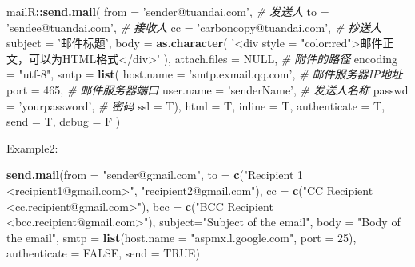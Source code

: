 \documentclass[]{book}
\newenvironment{Shaded}{\begin{snugshade}}{\end{snugshade}}
\newcommand{\KeywordTok}[1]{\textcolor[rgb]{0.13,0.29,0.53}{\textbf{#1}}}
\newcommand{\DataTypeTok}[1]{\textcolor[rgb]{0.13,0.29,0.53}{#1}}
\newcommand{\DecValTok}[1]{\textcolor[rgb]{0.00,0.00,0.81}{#1}}
\newcommand{\StringTok}[1]{\textcolor[rgb]{0.31,0.60,0.02}{#1}}
\newcommand{\CommentTok}[1]{\textcolor[rgb]{0.56,0.35,0.01}{\textit{#1}}}
\newcommand{\OtherTok}[1]{\textcolor[rgb]{0.56,0.35,0.01}{#1}}
\newcommand{\OperatorTok}[1]{\textcolor[rgb]{0.81,0.36,0.00}{\textbf{#1}}}
\newcommand{\NormalTok}[1]{#1}
\theoremstyle{definition}
\theoremstyle{definition}
\theoremstyle{definition}
\theoremstyle{remark}
\begin{document}
\begin{Shaded}
\begin{Highlighting}[]
\NormalTok{mailR}\OperatorTok{::}\KeywordTok{send.mail}\NormalTok{(}
  \DataTypeTok{from =} \StringTok{'sender@tuandai.com'}\NormalTok{, }\CommentTok{# 发送人}
  \DataTypeTok{to =} \StringTok{'sendee@tuandai.com'}\NormalTok{, }\CommentTok{# 接收人}
  \DataTypeTok{cc =} \StringTok{'carboncopy@tuandai.com'}\NormalTok{, }\CommentTok{# 抄送人}
  \DataTypeTok{subject =} \StringTok{'邮件标题'}\NormalTok{,}
  \DataTypeTok{body =} \KeywordTok{as.character}\NormalTok{(}
    \StringTok{'<div style = "color:red">邮件正文，可以为HTML格式</div>'}
\NormalTok{  ),}
  \DataTypeTok{attach.files =} \OtherTok{NULL}\NormalTok{, }\CommentTok{# 附件的路径}
  \DataTypeTok{encoding =} \StringTok{"utf-8"}\NormalTok{,}
  \DataTypeTok{smtp =} \KeywordTok{list}\NormalTok{(}
    \DataTypeTok{host.name =} \StringTok{'smtp.exmail.qq.com'}\NormalTok{, }\CommentTok{# 邮件服务器IP地址}
    \DataTypeTok{port =} \DecValTok{465}\NormalTok{, }\CommentTok{# 邮件服务器端口}
    \DataTypeTok{user.name =} \StringTok{'senderName'}\NormalTok{, }\CommentTok{# 发送人名称}
    \DataTypeTok{passwd =} \StringTok{'yourpassword'}\NormalTok{, }\CommentTok{# 密码}
    \DataTypeTok{ssl =}\NormalTok{ T),}
  \DataTypeTok{html =}\NormalTok{ T, }\DataTypeTok{inline =}\NormalTok{ T, }\DataTypeTok{authenticate =}\NormalTok{ T, }\DataTypeTok{send =}\NormalTok{ T, }\DataTypeTok{debug =}\NormalTok{ F}
\NormalTok{)}
\end{Highlighting}
\end{Shaded}

Example2:

\begin{Shaded}
\begin{Highlighting}[]
\KeywordTok{send.mail}\NormalTok{(}\DataTypeTok{from =} \StringTok{"sender@gmail.com"}\NormalTok{,}
          \DataTypeTok{to =} \KeywordTok{c}\NormalTok{(}\StringTok{"Recipient 1 <recipient1@gmail.com>"}\NormalTok{, }\StringTok{"recipient2@gmail.com"}\NormalTok{),}
          \DataTypeTok{cc =} \KeywordTok{c}\NormalTok{(}\StringTok{"CC Recipient <cc.recipient@gmail.com>"}\NormalTok{),}
          \DataTypeTok{bcc =} \KeywordTok{c}\NormalTok{(}\StringTok{"BCC Recipient <bcc.recipient@gmail.com>"}\NormalTok{),}
          \DataTypeTok{subject=}\StringTok{"Subject of the email"}\NormalTok{,}
          \DataTypeTok{body =} \StringTok{"Body of the email"}\NormalTok{,}
          \DataTypeTok{smtp =} \KeywordTok{list}\NormalTok{(}\DataTypeTok{host.name =} \StringTok{"aspmx.l.google.com"}\NormalTok{, }\DataTypeTok{port =} \DecValTok{25}\NormalTok{),}
          \DataTypeTok{authenticate =} \OtherTok{FALSE}\NormalTok{,}
          \DataTypeTok{send =} \OtherTok{TRUE}\NormalTok{)}
\end{Highlighting}
\end{Shaded}
\end{document}
